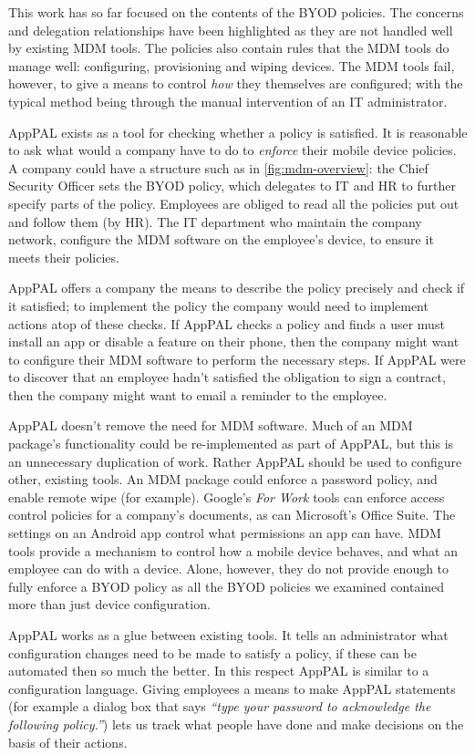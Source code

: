 \documentclass[thesis.tex]{subfiles}
\begin{document}
This work has so far focused on the contents of the BYOD policies.
The concerns and delegation relationships have been highlighted as
they are not handled well by existing \ac{MDM} tools.  The policies
also contain rules that the \ac{MDM} tools do manage well:
configuring, provisioning and wiping devices.  The \ac{MDM} tools
fail, however, to give a means to control \emph{how} they themselves
are configured; with the typical method being through the manual
intervention of an IT administrator.

AppPAL exists as a tool for checking whether a policy is satisfied.
It is reasonable to ask what would a company have to do to
\emph{enforce} their mobile device policies. A company could have a
structure such as in \autoref{fig:mdm-overview}: the Chief Security
Officer sets the BYOD policy, which delegates to IT and HR to further
specify parts of the policy.  Employees are obliged to read all the
policies put out and follow them (by HR).  The IT department who
maintain the company network, configure the \ac{MDM} software on the
employee's device, to ensure it meets their policies.

AppPAL offers a company the means to describe the policy precisely and
check if it satisfied; to
implement the policy the company would need to implement actions atop
of these checks.  If AppPAL checks a policy and finds a user must
install an app or disable a feature on their phone, then the company
might want to configure their \ac{MDM} software to perform the
necessary steps.  If AppPAL were to discover that an employee hadn't
satisfied the obligation to sign a contract, then the company might
want to email a reminder to the employee.

AppPAL doesn't remove the need for \ac{MDM} software.  Much of an
\ac{MDM} package's functionality could be re-implemented as part of
AppPAL, but this is an unnecessary duplication of work.  Rather AppPAL
should be used to configure other, existing tools.  An \ac{MDM}
package could enforce a password policy, and enable remote wipe (for
example).  Google's \emph{For Work} tools can enforce access control
policies for a company's documents, as can Microsoft's Office Suite.
The settings on an Android app control what permissions an app can
have.  \ac{MDM} tools provide a mechanism to control how a mobile
device behaves, and what an employee can do with a device.  Alone,
however, they do not provide enough to fully enforce a \ac{BYOD}
policy as all the \ac{BYOD} policies we examined contained more than
just device configuration.

AppPAL works as a glue between existing tools.  It tells an
administrator what configuration changes need to be made to satisfy a
policy, if these can be automated then so much the better.  In this
respect AppPAL is similar to a configuration language.  Giving
employees a means to make AppPAL statements (for example a dialog box
that says \emph{``type your password to acknowledge the following
policy.''}) lets us track what people have done and make decisions on
the basis of their actions.

%  
\end{document}
